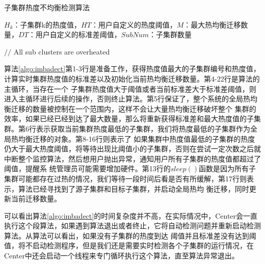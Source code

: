 \begin{algorithm}
    \caption{子集群热度不均衡检测算法}
    \label{algo:imbadect}
    \begin{algorithmic}[1] %
    \Require $H_k$：子集群k的热度值，$HT$：用户自定义的热度阈值，$M$：最大热均衡迁移数量，$DT$：用户自定义的标准差阈值，$SubNum$：子集群数量
    
          \State $//$ All sub clusters are overheated
          \EndIf
        \EndWhile
      \EndIf
    \EndWhile
    \end{algorithmic}
\end{algorithm}

算法\ref{algo:imbadect}第1-3行是准备工作，获得热度值最大的子集群编号和热度值，计算实时集群热度值的标准差以及初始化当前热均衡迁移数量。第4-22行是算法的主循环，当存在一个
子集群热度值大于阈值或者当前标准差大于标准差阈值，则进入主循环进行后续的操作，否则终止算法。第5行保证了，整个系统的全局热均衡迁移的数量被控制在一个范围内，这样不会让大量热均衡迁移破坏整个
集群的效率，如果已经已经到达了最大数量，那么将重新获得标准差和最大热度值的子集群。第6行表示获取当前集群热度最低的子集群，我们将热度最低的子集群作为全局热均衡迁移的对象。第8-16行则表示了
如果集群中热度值最低的子集群的热度仍大于最大热度阈值，将等待出现比阈值小的子集群，否则在尝试一定次数之后就中断整个监控算法，然后想用户抛出异常，通知用户所有子集群的热度值都超过了阈值，提醒系
统管理员可能需要增加硬件。第13行的$sleep()$函数是因为所有子集群可能都存在过热的情况，我们等待一段时间后看是否有所缓解，第17行则表示，算法已经寻找到了源子集群和目标子集群，并启动全局热均
衡迁移，同时更新当前迁移数量。

可以看出算法\ref{algo:imbadect}的时间复杂度并不高，在实际情况中，Center会一直执行这个段算法，如果遇到算法退出或者终止，它将自动检测问题并重新启动检测算法。从算法可以看出，如果没有子集群的热度到达
阈值并且标准差没有达到阈值，将不启动检测程序，但是我们还是需要实时检测各个子集群的运行情况，在Center中还会启动一个线程来专门循环执行这个算法，直至算法异常退出。

